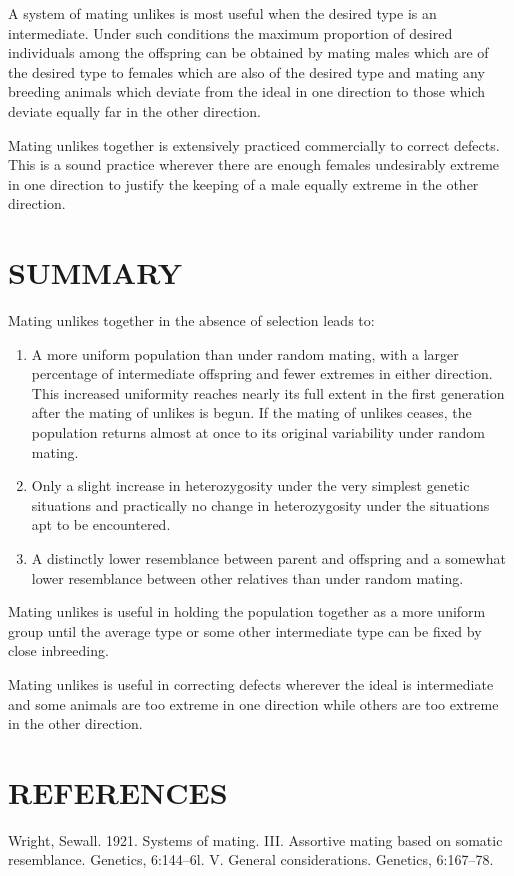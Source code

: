 A system of mating unlikes is most useful when the desired type
is an intermediate. Under such conditions the maximum proportion of
desired individuals among the offspring can be obtained by mating
males which are of the desired type to females which are also of the
desired type and mating any breeding animals which deviate from the
ideal in one direction to those which deviate equally far in the other
direction.

Mating unlikes together is extensively practiced commercially to
correct defects. This is a sound practice wherever there are enough
females undesirably extreme in one direction to justify the keeping of a
male equally extreme in the other direction.

\section*{SUMMARY}

Mating unlikes together in the absence of selection leads to:
\begin{enumerate}
\item A more uniform population than under random mating, with a
larger percentage of intermediate offspring and fewer extremes in either
direction. This increased uniformity reaches nearly its full extent in
the first generation after the mating of unlikes is begun. If the mating of
unlikes ceases, the population returns almost at once to its original
variability under random mating.
\item Only a slight increase in heterozygosity under the very simplest
genetic situations and practically no change in heterozygosity under the
situations apt to be encountered.
\item A distinctly lower resemblance between parent and offspring and
a somewhat lower resemblance between other relatives than under random
mating.
\end{enumerate}
Mating unlikes is useful in holding the population together as a
more uniform group until the average type or some other intermediate
type can be fixed by close inbreeding.

Mating unlikes is useful in correcting defects wherever the ideal is
intermediate and some animals are too extreme in one direction while
others are too extreme in the other direction.

\section*{REFERENCES}

\begin{hangparas}{0.5in}{1}%
Wright, Sewall. 1921. Systems of mating. {III}. Assortive mating based on somatic
resemblance. Genetics, 6:144--6l. V. General considerations. Genetics, 6:167--78.
\end{hangparas}
